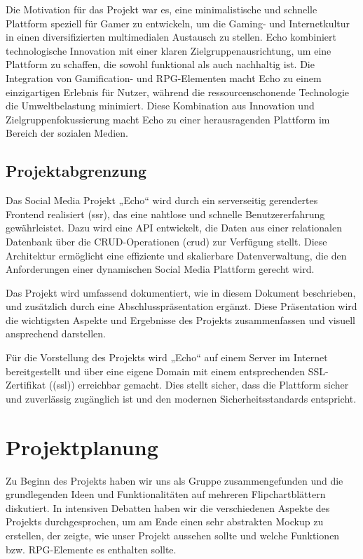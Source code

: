 \documentclass[a4paper,12pt]{article}
\begin{document}
Die Motivation für das Projekt war es, eine minimalistische und schnelle
Plattform speziell für Gamer zu entwickeln, um die Gaming- und Internetkultur
in einen diversifizierten multimedialen Austausch zu stellen. Echo kombiniert
technologische Innovation mit einer klaren Zielgruppenausrichtung, um eine
Plattform zu schaffen, die sowohl funktional als auch nachhaltig ist. Die
Integration von Gamification- und RPG-Elementen macht Echo zu einem
einzigartigen Erlebnis für Nutzer, während die ressourcenschonende Technologie
die Umweltbelastung minimiert. Diese Kombination aus Innovation und
Zielgruppenfokussierung macht Echo zu einer herausragenden Plattform im Bereich
der sozialen Medien.

\newpage
\subsection{Projektabgrenzung}
Das Social Media Projekt „Echo“ wird durch ein serverseitig gerendertes
Frontend realisiert (\gls{ssr}), das eine nahtlose und schnelle
Benutzererfahrung gewährleistet. Dazu wird eine API entwickelt, die Daten aus
einer relationalen Datenbank über die CRUD-Operationen (\gls{crud}) zur
Verfügung stellt. Diese Architektur ermöglicht eine effiziente und skalierbare
Datenverwaltung, die den Anforderungen einer dynamischen Social Media Plattform
gerecht wird.

Das Projekt wird umfassend dokumentiert, wie in diesem Dokument beschrieben,
und zusätzlich durch eine Abschlusspräsentation ergänzt. Diese Präsentation
wird die wichtigsten Aspekte und Ergebnisse des Projekts zusammenfassen und
visuell ansprechend darstellen.

Für die Vorstellung des Projekts wird „Echo“ auf einem Server im Internet
bereitgestellt und über eine eigene Domain mit einem entsprechenden
SSL-Zertifikat ((\gls{ssl})) erreichbar gemacht. Dies stellt sicher, dass die
Plattform sicher und zuverlässig zugänglich ist und den modernen
Sicherheitsstandards entspricht.

\newpage
\section{Projektplanung}
Zu Beginn des Projekts haben wir uns als Gruppe zusammengefunden und die
grundlegenden Ideen und Funktionalitäten auf mehreren Flipchartblättern
diskutiert. In intensiven Debatten haben wir die verschiedenen Aspekte des
Projekts durchgesprochen, um am Ende einen sehr abstrakten Mockup zu erstellen,
der zeigte, wie unser Projekt aussehen sollte und welche Funktionen bzw.
RPG-Elemente es enthalten sollte.
\end{document}

